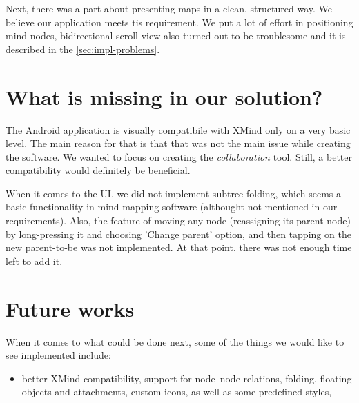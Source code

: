 Next, there was a part about presenting maps in a clean, structured way. We believe our application meets tis requirement. We put a lot of effort in positioning mind nodes, bidirectional scroll view also turned out to be troublesome and it is described in the \cref{sec:impl-problems}.

\section{What is missing in our solution?}
\label{summary-missing}
The Android application is visually compatibile with XMind only on a very basic level. The main reason for that is that that was not the main issue while creating the software. We wanted to focus on creating the \emph{collaboration} tool. Still, a better compatibility would definitely be beneficial. 

When it comes to the UI, we did not implement subtree folding, which seems a basic functionality in mind mapping software (althought not mentioned in our requirements). Also, the feature of moving any node (reassigning its parent node) by long-pressing it and choosing 'Change parent' option, and then tapping on the new parent-to-be was not implemented. At that point, there was not enough time left to add it.

\section{Future works}
\label{summary-future}
When it comes to what could be done next, some of the things we would like to see implemented include:

\begin{itemize}
	\item better XMind compatibility, support for node--node relations, folding, floating objects and attachments, custom icons, as well as some predefined styles,
\end{itemize}

